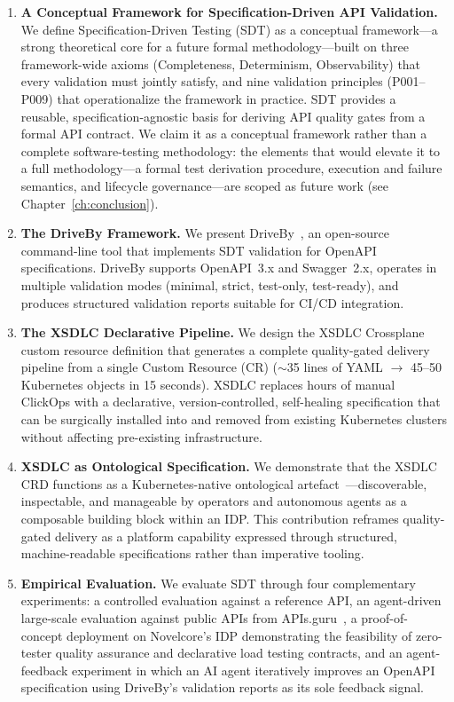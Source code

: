 \begin{enumerate}
  \item \textbf{A Conceptual Framework for Specification-Driven API Validation.} We define Specification-Driven Testing (SDT) as a conceptual framework---a strong theoretical core for a future formal methodology---built on three framework-wide axioms (Completeness, Determinism, Observability) that every validation must jointly satisfy, and nine validation principles (P001--P009) that operationalize the framework in practice. SDT provides a reusable, specification-agnostic basis for deriving API quality gates from a formal API contract. We claim it as a conceptual framework rather than a complete software-testing methodology: the elements that would elevate it to a full methodology---a formal test derivation procedure, execution and failure semantics, and lifecycle governance---are scoped as future work (see Chapter~\ref{ch:conclusion}).

  \item \textbf{The DriveBy Framework.} We present DriveBy~\cite{driveby}, an open-source command-line tool that implements SDT validation for OpenAPI specifications. DriveBy supports OpenAPI~3.x and Swagger~2.x, operates in multiple validation modes (minimal, strict, test-only, test-ready), and produces structured validation reports suitable for CI/CD integration.

  \item \textbf{The XSDLC Declarative Pipeline.} We design the XSDLC Crossplane custom resource definition that generates a complete quality-gated delivery pipeline from a single Custom Resource (CR) (\(\sim\)35 lines of YAML $\rightarrow$ 45--50 Kubernetes objects in 15 seconds). XSDLC replaces hours of manual ClickOps with a declarative, version-controlled, self-healing specification that can be surgically installed into and removed from existing Kubernetes clusters without affecting pre-existing infrastructure.

  \item \textbf{XSDLC as Ontological Specification.} We demonstrate that the XSDLC CRD functions as a Kubernetes-native ontological artefact~\cite{gruber-ontology}---discoverable, inspectable, and manageable by operators and autonomous agents as a composable building block within an IDP. This contribution reframes quality-gated delivery as a platform capability expressed through structured, machine-readable specifications rather than imperative tooling.

  \item \textbf{Empirical Evaluation.} We evaluate SDT through four complementary experiments: a controlled evaluation against a reference API, an agent-driven large-scale evaluation against public APIs from APIs.guru~\cite{apis-guru}, a proof-of-concept deployment on Novelcore's IDP demonstrating the feasibility of zero-tester quality assurance and declarative load testing contracts, and an agent-feedback experiment in which an AI agent iteratively improves an OpenAPI specification using DriveBy's validation reports as its sole feedback signal.


\end{enumerate}
